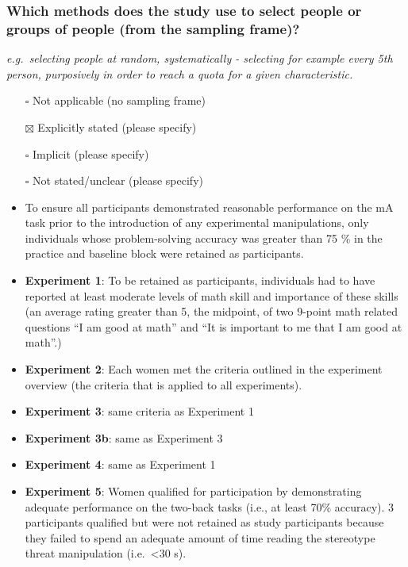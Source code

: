 \documentclass[
  doc, a4paper]{apa7}
\begin{document}
\subsubsection{Which methods does the study use to select people or groups of people (from the sampling frame)?}\label{which-methods-does-the-study-use-to-select-people-or-groups-of-people-from-the-sampling-frame}

\emph{e.g.~selecting people at random, systematically - selecting for example every 5th person, purposively in order to reach a quota for a given characteristic.}

\begin{itemize}
\item[$\square$]
  Not applicable (no sampling frame)
\item[$\boxtimes$]
  Explicitly stated (please specify)
\item[$\square$]
  Implicit (please specify)
\item[$\square$]
  Not stated/unclear (please specify)
\item
  To ensure all participants demonstrated reasonable performance on the mA task prior to the introduction of any experimental manipulations, only individuals whose problem-solving accuracy was greater than 75 \% in the practice and baseline block were retained as participants.
\item
  \textbf{Experiment 1}: To be retained as participants, individuals had to have reported at least moderate levels of math skill and importance of these skills (an average rating greater than 5, the midpoint, of two 9-point math related questions ``I am good at math'' and ``It is important to me that I am good at math''.)\\
\item
  \textbf{Experiment 2}: Each women met the criteria outlined in the experiment overview (the criteria that is applied to all experiments).
\item
  \textbf{Experiment 3}: same criteria as Experiment 1
\item
  \textbf{Experiment 3b}: same as Experiment 3
\item
  \textbf{Experiment 4}: same as Experiment 1
\item
  \textbf{Experiment 5}: Women qualified for participation by demonstrating adequate performance on the two-back tasks (i.e., at least 70\% accuracy). 3 participants qualified but were not retained as study participants because they failed to spend an adequate amount of time reading the stereotype threat manipulation (i.e.~\textless30 s).
\end{itemize}
\end{document}

